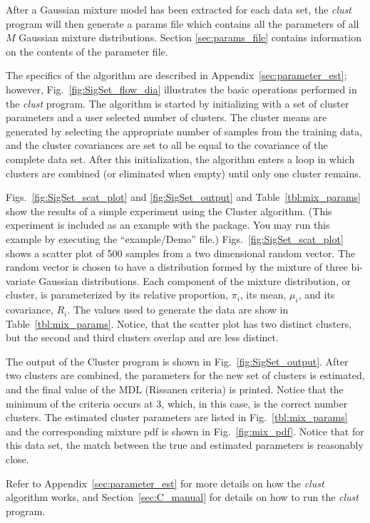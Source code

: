 \documentclass[12pt]{article}
\begin{document}
After a Gaussian mixture model has been extracted for
each data set,
the {\em clust} program will then generate a params file which contains 
all the parameters of all $M$ Gaussian mixture distributions.
Section \ref{sec:params_file} contains information
on the contents of the parameter file.

The specifics of the algorithm are described 
in Appendix~\ref{sec:parameter_est};
however, Fig.~\ref{fig:SigSet_flow_dia} illustrates the basic operations
performed in the {\em clust} program. 
The algorithm is started by initializing
with a set of cluster parameters and a user selected number of clusters.
The cluster means are generated by selecting the appropriate number of samples
from the training data, and the cluster covariances are set to all be
equal to the covariance of the complete data set.
After this initialization, 
the algorithm enters a loop in which clusters are combined
(or eliminated when empty) until only one cluster remains.

Figs.~\ref{fig:SigSet_scat_plot} 
and \ref{fig:SigSet_output} and Table~\ref{tbl:mix_params}
show the results of a simple experiment using the Cluster algorithm.
(This experiment is included as an example with the package.
You may run this example by executing the ``example/Demo'' file.)
Figs.~\ref{fig:SigSet_scat_plot} shows a scatter plot of 500 samples 
from a two dimensional random vector.
The random vector is chosen to have a distribution formed by the mixture
of three bi-variate Gaussian distributions. 
Each component of the mixture distribution, or cluster,
is parameterized by its relative proportion, $\pi_i$, its mean, $\mu_i$, 
and its covariance, $R_i$. 
The values used to generate the data are show in Table~\ref{tbl:mix_params}.
Notice, that the scatter plot has two distinct clusters, but the second
and third clusters overlap and are less distinct.

The output of the Cluster program is shown in Fig.~\ref{fig:SigSet_output}.
After two clusters are combined, the parameters for the new set
of clusters is estimated, and the final value of the MDL 
(Rissanen criteria) is printed.
Notice that the minimum of the criteria occurs at 3,
which, in this case, is the correct number clusters.
The estimated cluster parameters are listed 
in Fig.~\ref{tbl:mix_params} and the corresponding 
mixture pdf is shown in Fig.~\ref{fig:mix_pdf}.
Notice that for this data set, 
the match between the true and estimated parameters 
is reasonably close.

Refer to Appendix~\ref{sec:parameter_est} for more
details on how the {\em clust} algorithm works,
and Section~\ref{sec:C_manual} for details
on how to run the {\em clust} program.
\end{document}
